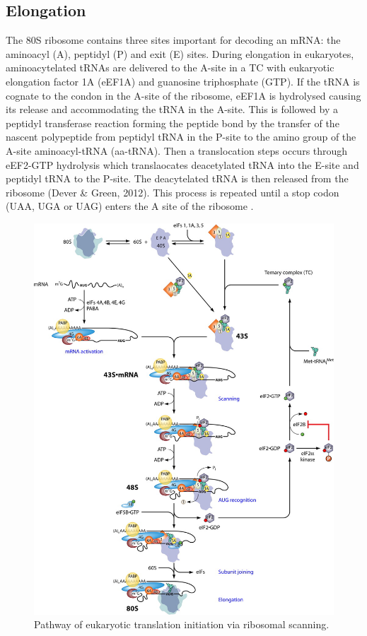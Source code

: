 \documentclass[12pt,openany]{book}
\begin{document}
\subsection{Elongation}

The 80S ribosome contains three sites important for decoding an mRNA:
the aminoacyl (A), peptidyl (P) and exit (E) sites. During elongation in
eukaryotes, aminoacytelated tRNAs are delivered to the A-site in a TC
with eukaryotic elongation factor 1A (eEF1A) and guanosine triphosphate
(GTP). If the tRNA is cognate to the condon in the A-site of the
ribosome, eEF1A is hydrolysed causing its release and accommodating the
tRNA in the A-site. This is followed by a peptidyl transferase reaction
forming the peptide bond by the transfer of the nascent polypeptide from
peptidyl tRNA in the P-site to the amino group of the A-site
aminoacyl-tRNA (aa-tRNA). Then a translocation steps occurs through
eEF2-GTP hydrolysis which translaocates deacetylated tRNA into the
E-site and peptidyl tRNA to the P-site. The deacytelated tRNA is then
released from the ribosome (Dever \& Green, 2012). This process is
repeated until a stop codon (UAA, UGA or UAG) enters the A site of the
ribosome .

\begin{figure}[ht]
\includegraphics{./figures/initiation.jpg} 
  \caption{Pathway of eukaryotic translation initiation via ribosomal scanning.
  \label{fig:initiation}}
\end{figure}
\end{document}
